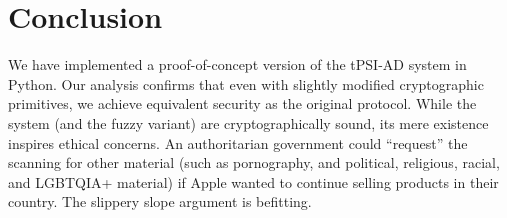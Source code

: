 
\section{Conclusion} %
\label{sec:conclusion}


We have implemented a proof-of-concept version of the tPSI-AD system in Python. Our analysis confirms that even with slightly modified cryptographic primitives, we achieve equivalent security as the original protocol. While the system  (and the fuzzy variant) are cryptographically sound, its mere existence inspires ethical concerns. An authoritarian government could ``request'' the scanning for other material (such as pornography, and political, religious, racial, and LGBTQIA+ material) if Apple  wanted to continue selling products in their country. The slippery slope argument is befitting.
